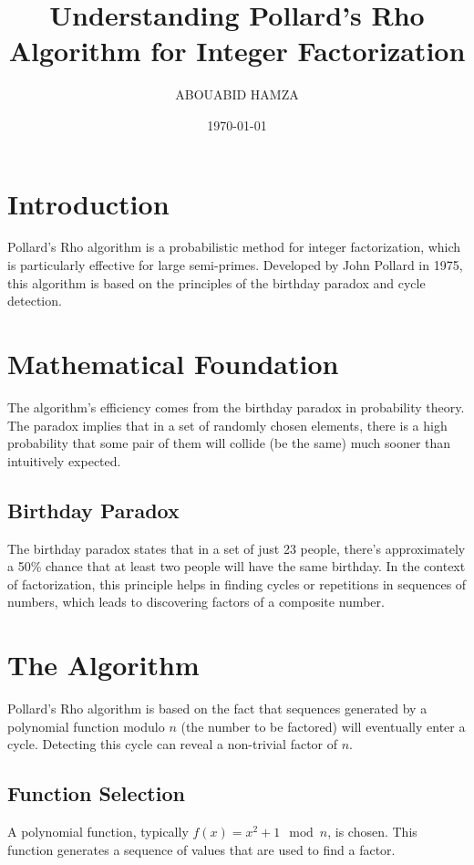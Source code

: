 \documentclass{article}
\begin{document}
\title{Understanding Pollard's Rho Algorithm for Integer Factorization}
\author{ABOUABID HAMZA}
\date{\today}
\maketitle

\section{Introduction}
Pollard's Rho algorithm is a probabilistic method for integer factorization, which is particularly effective for large semi-primes. Developed by John Pollard in 1975, this algorithm is based on the principles of the birthday paradox and cycle detection.

\section{Mathematical Foundation}
The algorithm's efficiency comes from the birthday paradox in probability theory. The paradox implies that in a set of randomly chosen elements, there is a high probability that some pair of them will collide (be the same) much sooner than intuitively expected.

\subsection{Birthday Paradox}
The birthday paradox states that in a set of just 23 people, there's approximately a 50\% chance that at least two people will have the same birthday. In the context of factorization, this principle helps in finding cycles or repetitions in sequences of numbers, which leads to discovering factors of a composite number.

\section{The Algorithm}
Pollard's Rho algorithm is based on the fact that sequences generated by a polynomial function modulo $n$ (the number to be factored) will eventually enter a cycle. Detecting this cycle can reveal a non-trivial factor of $n$.

\subsection{Function Selection}
A polynomial function, typically $f(x) = x^2 + 1 \mod n$, is chosen. This function generates a sequence of values that are used to find a factor.
\end{document}

